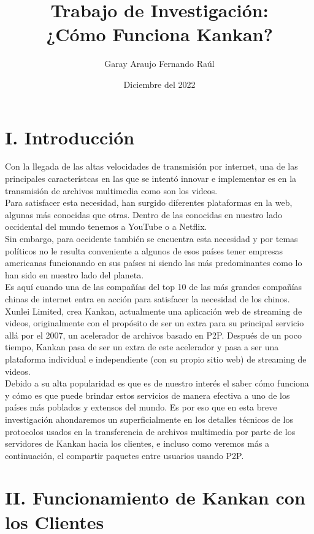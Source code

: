 \documentclass[12pt]{report}
\begin{document}
\title{Trabajo de Investigación:\\¿Cómo Funciona Kankan?}
\author{Garay Araujo Fernando Raúl}
\date{Diciembre del 2022}
\maketitle
\newpage

\section*{I. Introducción}

Con la llegada de las altas velocidades de transmisión por internet, una de las principales característcas en las que se intentó innovar e implementar es en la transmisión de archivos multimedia como son los videos.\\
Para satisfacer esta necesidad, han surgido diferentes plataformas en la web, algunas más conocidas que otras. Dentro de las conocidas en nuestro lado occidental del mundo tenemos a YouTube o a Netflix.\\
Sin embargo, para occidente también se encuentra esta necesidad y por temas políticos no le resulta conveniente a algunos de esos países tener empresas americanas funcionando en sus países ni siendo las más predominantes como lo han sido en nuestro lado del planeta.\\
Es aquí cuando una de las compañías del top 10 de las más grandes compañías chinas de internet entra en acción para satisfacer la necesidad de los chinos. Xunlei Limited, crea Kankan, actualmente una aplicación web de streaming de videos, originalmente con el propósito de ser un extra para su principal servicio allá por el 2007, un acelerador de archivos basado en P2P. Después de un poco tiempo, Kankan pasa de ser un extra de este acelerador y pasa a ser una plataforma individual e independiente (con su propio sitio web) de streaming de videos.\\
Debido a su alta popularidad es que es de nuestro interés el saber cómo funciona y cómo es que puede brindar estos servicios de manera efectiva a uno de los países más poblados y extensos del mundo. Es por eso que en esta breve investigación ahondaremos un superficialmente en los detalles técnicos de los protocolos usados en la transferencia de archivos multimedia por parte de los servidores de Kankan hacia los clientes, e incluso como veremos más a continuación, el compartir paquetes entre usuarios usando P2P.

\section*{II. Funcionamiento de Kankan con los Clientes}
\end{document}
